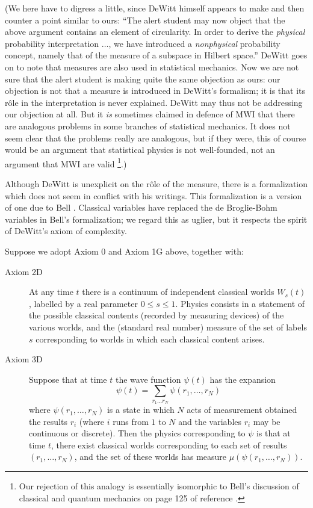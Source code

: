 \documentclass[aps,pra,12pt]{revtex4}
\begin{document}
(We here have to digress a little, since DeWitt himself appears to make
and then counter a point similar to ours: ``The alert student may now
object that the above argument contains an element of circularity. In
order to derive the {\em physical} probability interpretation
$\ldots$, we have introduced a {\em nonphysical} probability concept,
namely that of the measure of a subspace in Hilbert space.''  DeWitt
goes on to note that measures are also used in statistical mechanics.
Now we are not sure that the alert student is making quite the same
objection as ours: our objection is not that a measure is introduced
in DeWitt's formalism; it is that its r\^{o}le in the interpretation is
never explained.  DeWitt may thus not be addressing our objection at
all.  But it {\em is} sometimes claimed in defence of MWI that there are 
analogous problems in some branches of statistical mechanics.
It does not seem clear that the problems really are analogous,
but if they were, this of course would be an argument 
that statistical physics is not well-founded, not an argument that  
MWI are valid \footnote{Our rejection of this analogy is essentially 
isomorphic to Bell's discussion
of classical and quantum mechanics on page 125 of reference \cite{bell2}.}.)

Although DeWitt is unexplicit on the r\^{o}le of the measure, there is
a formalization which does not seem in conflict with his writings. 
This formalization is a version of one due to Bell \cite{bell1,bell2}.
Classical variables have replaced the de Broglie-Bohm variables
in Bell's formalization; we regard this as uglier, but it respects the
spirit of DeWitt's axiom of complexity. 

Suppose we adopt Axiom 0 and Axiom 1G above, together with:
\begin{description}
\item[Axiom 2D] At any time $t$ there 
is a continuum of independent classical worlds 
$W_s (t)$, labelled by a real parameter $0 \leq s \leq 1$.
Physics consists in a statement of the possible classical contents (recorded by
measuring devices) of the various worlds, and the (standard real number)
measure of the set of labels $s$ corresponding to worlds
in which each classical content arises. 

\item[Axiom 3D] Suppose that at time $t$ the 
wave function $\psi(t)$ has the expansion 
\begin{equation}
\psi(t) = \sum_{r_1 \ldots r_N  }  \psi (r_1 , \ldots , r_N )
\end{equation}
where $\psi (r_1 , \ldots , r_N )$ is a state in which $N$ acts of measurement
obtained the results $r_i$ (where $i$ runs from $1$ to $N$ and the variables
$r_i$ may be continuous or discrete). 
Then the physics corresponding to $\psi$ is that at time $t$, there exist 
classical worlds corresponding to each set of results $(r_1 , \ldots , r_N )$,
and the set of these worlds has measure $\mu (\psi (r_1 , \ldots , r_N ))$. 
\end{description}
\end{document}

